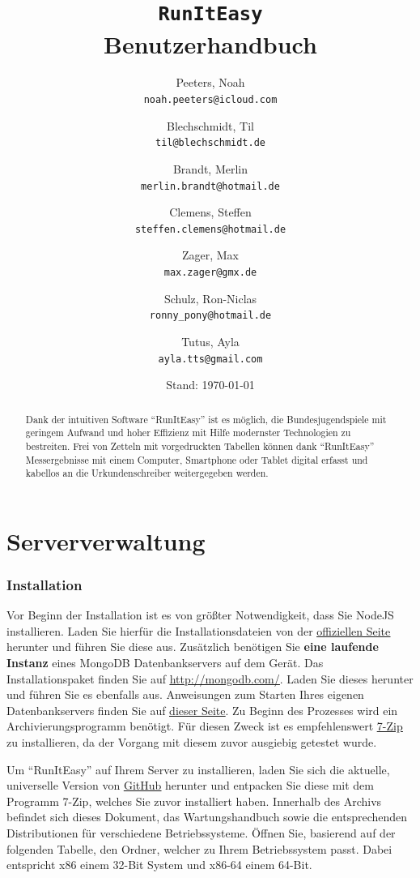 \documentclass[11pt,a4paper,titlepage,german]{article}
\title{\texttt{RunItEasy}\\ \textbf{Benutzerhandbuch}}
\author{
	Peeters, Noah\\ \texttt{noah.peeters@icloud.com}
	\and
	Blechschmidt, Til\\ \texttt{til@blechschmidt.de}
	\and
	Brandt, Merlin\\ \texttt{merlin.brandt@hotmail.de}
	\and
	Clemens, Steffen\\ \texttt{steffen.clemens@hotmail.de}
	\and
	Zager, Max\\ \texttt{max.zager@gmx.de}
	\and
	Schulz, Ron-Niclas\\ \texttt{ronny\_pony@hotmail.de}
	\and
	Tutus, Ayla\\ \texttt{ayla.tts@gmail.com}
	
}
\date{Stand: \today}
\begin{document}
	\maketitle
	
	\begin{abstract}
		Dank der intuitiven Software “RunItEasy” ist es möglich, die Bundesjugendspiele mit geringem Aufwand und hoher Effizienz mit Hilfe modernster Technologien zu bestreiten. Frei von Zetteln mit vorgedruckten Tabellen können dank “RunItEasy” Messergebnisse mit einem Computer, Smartphone oder Tablet digital erfasst und kabellos an die Urkundenschreiber weitergegeben werden. 
	\end{abstract}
	
	\newpage
	
	\tableofcontents
	
	\newpage
	
	\part{Serververwaltung}
		\section{Installation}
			\label{install}
			Vor Beginn der Installation ist es von größter Notwendigkeit, dass Sie NodeJS installieren. Laden Sie hierfür die Installationsdateien von der \href{https://nodejs.org/en/download/}{\underline{\color{blue}offiziellen Seite}} herunter und führen Sie diese aus. Zusätzlich benötigen Sie \textbf{eine laufende Instanz} eines MongoDB Datenbankservers auf dem Gerät. Das Installationspaket finden Sie auf \href{https://www.mongodb.com/download-center}{\underline{\color{blue}http://mongodb.com/}}. Laden Sie dieses herunter und führen Sie es ebenfalls aus. Anweisungen zum Starten Ihres eigenen Datenbankservers finden Sie auf \href{https://docs.mongodb.com/manual/tutorial/install-mongodb-on-windows/#run-mongodb-community-edition}{\underline{\color{blue}dieser Seite}}. Zu Beginn des Prozesses wird ein Archivierungsprogramm benötigt. Für diesen Zweck ist es empfehlenswert \href{http://www.7-zip.org/download.html}{\underline{\color{blue}7-Zip}} zu installieren, da der Vorgang mit diesem zuvor ausgiebig getestet wurde.
			
			Um “RunItEasy” auf Ihrem Server zu installieren, laden Sie sich die aktuelle, universelle Version von \href{https://github.com/TheMegaTB/BJS/releases}{\underline{\color{blue}GitHub}} herunter und entpacken Sie diese mit dem Programm 7-Zip, welches Sie zuvor installiert haben. Innerhalb des Archivs befindet sich dieses Dokument, das Wartungshandbuch sowie die entsprechenden Distributionen für verschiedene Betriebssysteme. Öffnen Sie, basierend auf der folgenden Tabelle, den Ordner, welcher zu Ihrem Betriebssystem passt. Dabei entspricht x86 einem 32-Bit System und x86-64 einem 64-Bit.
\end{document}
